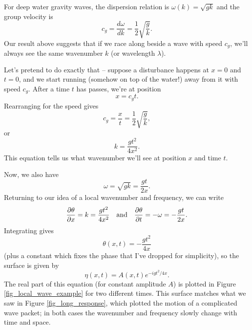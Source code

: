 \begin{example}
\label{ex_deep_water_waves}
For deep water gravity waves, the dispersion relation is $\omega(k) = \sqrt{gk}$ and the group velocity is
\[
c_g = \frac{d\omega}{dk} = \frac{1}{2} \sqrt{ \frac{g}{k} }.
\]
Our result above suggests that if we race along beside a wave with speed $c_g$, we'll always see the same wavenumber $k$ (or wavelength $\lambda$).

Let's pretend to do exactly that -- suppose a disturbance happens at $x=0$ and $t = 0$, and we start running (somehow on top of the water!) away from it with speed $c_g$.  After a time $t$ has passes, we're at position
\[
x = c_g t.
\]
Rearranging for the speed gives
\[
c_g = \frac{x}{t} = \frac{1}{2} \sqrt{ \frac{g}{k} },
\]
or
\begin{equation}
k = \frac{gt^2}{4x^2}.
\end{equation}
This equation tells us what wavenumber we'll see at position $x$ and time $t$.

Now, we also have
\begin{equation}
\omega = \sqrt{gk} = \frac{gt}{2x}.
\end{equation}
Returning to our idea of a local wavenumber and frequency, we can write
\[
\frac{\partial {\theta}}{\partial {x}} = k = \frac{gt^2}{4x^2} \quad \text{and} \quad \frac{\partial {\theta}}{\partial {t}} = -\omega = -\frac{gt}{2x}.
\]
Integrating gives
\begin{equation}
\theta(x, t) = -\frac{gt^2}{4x}
\end{equation}
(plus a constant which fixes the phase that I've dropped for simplicity), so the surface is given by
\begin{equation}
\label{eq_surface_reponse}
\eta(x, t) = A(x, t) e^{-i gt^2/4x}.
\end{equation}
The real part of this equation (for constant amplitude $A$) is plotted in Figure \ref{fig_local_wave_example} for two different times.  This surface matches what we saw in Figure \ref{fig_long_response}, which plotted the motion of a complicated wave packet; in both cases the wavenumber and frequency slowly change with time and space.
\end{example}

